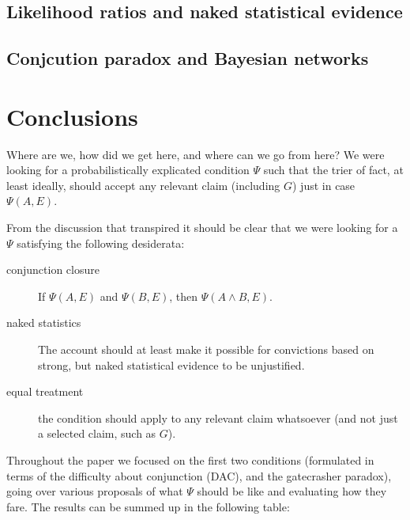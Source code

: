 \documentclass[10pt,dvipsnames,enabledeprecatedfontcommands]{scrartcl}
\newcommand{\et}{\wedge}
\begin{document}
\subsection{Likelihood ratios and naked statistical
evidence}\label{likelihood-ratios-and-naked-statistical-evidence}

\subsection{Conjcution paradox and Bayesian
networks}\label{conjcution-paradox-and-bayesian-networks}

\section{Conclusions}\label{conclusions}

Where are we, how did we get here, and where can we go from here? We
were looking for a probabilistically explicated condition \(\Psi\) such
that the trier of fact, at least ideally, should accept any relevant
claim (including \(G\)) just in case \(\Psi(A,E)\).

From the discussion that transpired it should be clear that we were
looking for a \(\Psi\) satisfying the following desiderata:

\begin{description}
\item[conjunction closure] If $\Psi(A,E)$ and $\Psi(B,E)$, then $\Psi(A\et B,E)$.
\item[naked statistics] The account should at least make it possible for convictions based on strong, but naked statistical evidence to be unjustified. 
\item[equal treatment] the condition should apply to any relevant claim whatsoever (and not just a selected claim, such as $G$).
\end{description}

Throughout the paper we focused on the first two conditions (formulated
in terms of the difficulty about conjunction (DAC), and the gatecrasher
paradox), going over various proposals of what \(\Psi\) should be like
and evaluating how they fare. The results can be summed up in the
following table:
\end{document}
